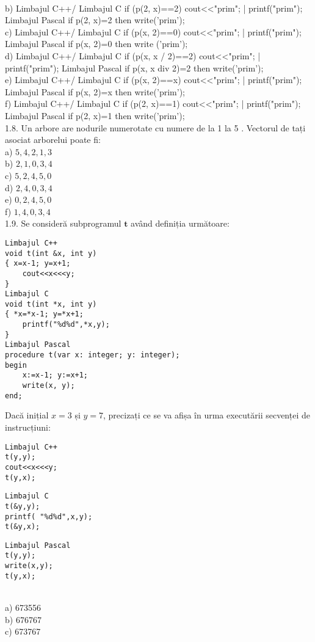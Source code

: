 \\
b) Limbajul C++/ Limbajul C
if (p(2, x)==2)  cout<<"prim"; | printf("prim");
Limbajul Pascal
if p(2, x)=2 then write('prim');
\\
c) Limbajul C++/ Limbajul C
if (p(x, 2)==0)  cout<<"prim"; | printf("prim");
Limbajul Pascal
if p(x, 2)=0 then write ('prim');
\\
d) Limbajul C++/ Limbajul C
if (p(x, x / 2)==2) cout<<"prim"; | printf("prim");
Limbajul Pascal
if p(x, x div 2)=2 then write('prim');
\\
e) Limbajul C++/ Limbajul C
if (p(x, 2)==x) cout<<"prim"; | printf("prim");
Limbajul Pascal
if p(x, 2)=x then write('prim');
\\
f) Limbajul C++/ Limbajul C
if (p(2, x)==1) cout<<"prim";  | printf("prim");
Limbajul Pascal
if p(2, x)=1 then write('prim');
\\
1.8. Un arbore are nodurile numerotate cu numere de la 1 la 5 . Vectorul de tați asociat arborelui poate fi:
\\
a) $5,4,2,1,3$
\\
b) $2,1,0,3,4$
\\
c) $5,2,4,5,0$
\\
d) $2,4,0,3,4$
\\
e) $0,2,4,5,0$
\\
f) $1,4,0,3,4$
\\
1.9. Se consideră subprogramul $\mathbf{t}$ având definiția următoare:
\begin{verbatim}
Limbajul C++
void t(int &x, int y)
{ x=x-1; y=x+1;
    cout<<x<<<y;
}
Limbajul C
void t(int *x, int y)
{ *x=*x-1; y=*x+1;
    printf("%d%d",*x,y);
}
Limbajul Pascal
procedure t(var x: integer; y: integer);
begin
    x:=x-1; y:=x+1;
    write(x, y);
end;
\end{verbatim}
Dacă inițial $x=3$ și $y=7$, precizați ce se va afișa în urma executării secvenței de instrucțiuni:
\begin{verbatim}
Limbajul C++
t(y,y);
cout<<x<<<y;
t(y,x);
\end{verbatim}
\begin{verbatim}
Limbajul C
t(&y,y);
printf( "%d%d",x,y);
t(&y,x);
\end{verbatim}
\begin{verbatim}
Limbajul Pascal
t(y,y);
write(x,y);
t(y,x);
\end{verbatim}
\\
a) 673556
\\
b) 676767
\\
c) 673767
\\
